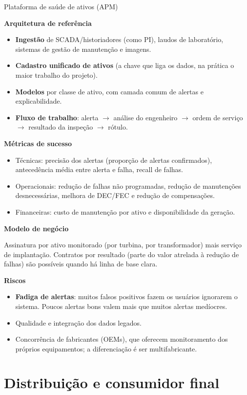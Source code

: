 \documentclass[10pt,a4paper,oneside]{article}
\newcommand{\prodsec}[1]{\par\medskip\noindent\textbf{\color{prodcolor}#1}\par\smallskip}
\begin{document}
\begin{produto}{Plataforma de saúde de ativos (APM)}
\prodsec{Arquitetura de referência}
\begin{itemize}
  \item \textbf{Ingestão} de SCADA/historiadores (como PI), laudos de
    laboratório, sistemas de gestão de manutenção e imagens.
  \item \textbf{Cadastro unificado de ativos} (a chave que liga os dados, na
    prática o maior trabalho do projeto).
  \item \textbf{Modelos} por classe de ativo, com camada comum de alertas e
    explicabilidade.
  \item \textbf{Fluxo de trabalho}: alerta $\rightarrow$ análise do engenheiro
    $\rightarrow$ ordem de serviço $\rightarrow$ resultado da inspeção
    $\rightarrow$ rótulo.
\end{itemize}

\prodsec{Métricas de sucesso}
\begin{itemize}
  \item Técnicas: precisão dos alertas (proporção de alertas confirmados),
    antecedência média entre alerta e falha, recall de falhas.
  \item Operacionais: redução de falhas não programadas, redução de
    manutenções desnecessárias, melhora de DEC/FEC e redução de compensações.
  \item Financeiras: custo de manutenção por ativo e disponibilidade da
    geração.
\end{itemize}

\prodsec{Modelo de negócio}
Assinatura por ativo monitorado (por turbina, por transformador) mais serviço
de implantação. Contratos por resultado (parte do valor atrelada à redução de
falhas) são possíveis quando há linha de base clara.

\prodsec{Riscos}
\begin{itemize}
  \item \textbf{Fadiga de alertas}: muitos falsos positivos fazem os usuários
    ignorarem o sistema. Poucos alertas bons valem mais que muitos alertas
    medíocres.
  \item Qualidade e integração dos dados legados.
  \item Concorrência de fabricantes (OEMs), que oferecem monitoramento dos
    próprios equipamentos; a diferenciação é ser multifabricante.
\end{itemize}
\end{produto}

\section{Distribuição e consumidor final}
\end{document}
